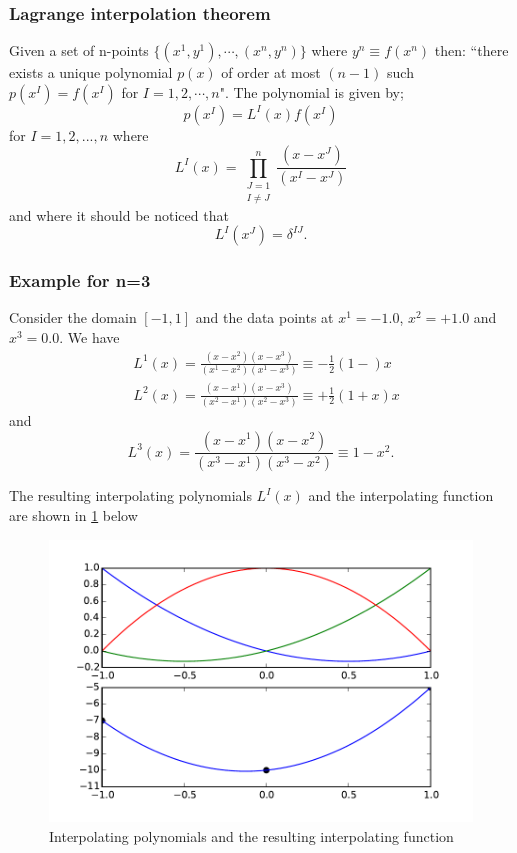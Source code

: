 \subsubsection{Lagrange interpolation theorem}
Given a set of n-points $\{ (x^1, y^1),\cdots,(x^n, y^n)\}$ where $y^n \equiv f({x^n})$ then: ``there exists a unique polynomial $p(x)$ of order at most $(n-1)$ such $p(x^I) = f(x^I)$ for $I=1,2,\cdots,n$". The polynomial is given by;
\begin{equation}\label{eq:pol}
  p(x^I) = L^I(x) f(x^I)  
\end{equation}
for $I=1,2,...,n$ where
\begin{equation}\label{eq:coef}
  L^I(x) = \prod_{\substack{J = 1\\ I \ne J}}^n \frac{(x - x^J)}{(x^I - x^J)}
\end{equation}
and where it should be noticed that
\[L^I(x^J) = \delta^{IJ}.\]

\subsubsection*{Example for n=3}
Consider the domain $[ - 1,1]$ and the data points at ${x^1} =  - 1.0$, ${x^2} =  + 1.0$ and ${x^3} = 0.0$. We have
\begin{align*}
& L^1(x) = \frac{(x - x^2)(x - x^3)}{(x^1 - x^2)(x^1-x^3)} \equiv  - \frac{1}{2}(1 - )x\\
& L^2(x) = \frac{(x - x^1)(x - x^3)}{(x^2 - x^1)(x^2 - x^3)} \equiv  + \frac{1}{2}(1 + x)x
\end{align*}
and
\[L^3(x) = \frac{(x - x^1)(x - x^2)}{(x^3 - x^1)(x^3 - x^2)} \equiv 1 - x^2.\]

The resulting interpolating polynomials $L^I(x)$ and the interpolating function  are shown in \cref{fig:pols} below
\begin{figure}[H]
  \centering
  \includegraphics[width=16cm]{func.pdf}
  \caption{Interpolating polynomials and the resulting interpolating function}
  \label{fig:pols}
\end{figure}

